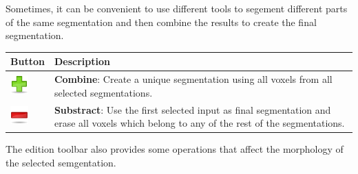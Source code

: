Sometimes, it can be convenient to use different tools to segement different
parts of the same segmentation and then combine the results to create the final 
segmentation.
\vspace{0.3cm}

\begin{tabular}{| m{1.3cm} | m{13.5cm} |}
\hline
\textbf{Button} & \textbf{Description}\\
\hline
\includegraphics[width=0.7cm]{../../frontend/rsc/add} &
\textbf{Combine}: Create a unique segmentation using all voxels from all
selected segmentations.\\
\hline
\includegraphics[width=0.7cm]{../../frontend/rsc/remove} &
\textbf{Substract}: Use the first selected input as final segmentation and erase
all voxels which belong to any of the rest of the segmentations.\\
\hline
\end{tabular}
\vspace{0.3cm}

The edition toolbar also provides some operations that affect the morphology of the 
selected semgentation.
\vspace{0.3cm}

